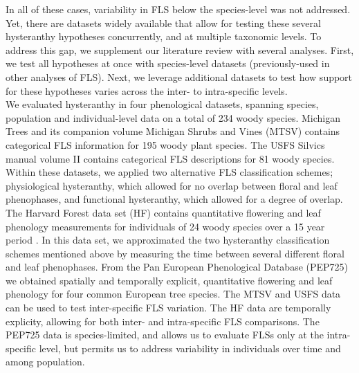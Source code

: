 \documentclass[12pt]{article}\usepackage[]{graphicx}\usepackage[]{color}
\begin{document}
\indent In all of these cases, variability in FLS below the species-level was not addressed. Yet, there are datasets widely available that allow for testing these several hysteranthy hypotheses concurrently, and at multiple taxonomic levels. To address this gap, we supplement our literature review with several analyses. First, we test all hypotheses at once with species-level datasets (previously-used in other analyses of FLS). Next, we leverage additional datasets to test how support for these hypotheses varies across the inter- to intra-specific levels.\\ 

\indent We evaluated hysteranthy in four phenological datasets, spanning species, population and individual-level data on a total of 234 woody species. Michigan Trees and its companion volume Michigan Shrubs and Vines \citep{Barnes2004,Barnes2016} (MTSV) contains categorical FLS information for 195 woody plant species. The USFS Silvics manual volume II \citep{Burns1990} contains categorical FLS descriptions for 81 woody species. Within these datasets, we applied two alternative FLS classification schemes; physiological hysteranthy, which allowed for no overlap between floral and leaf phenophases, and functional hysteranthy, which allowed for a degree of overlap. The Harvard Forest data set (HF) contains quantitative flowering and leaf phenology measurements for individuals of 24 woody species over a 15 year period \citep{OKeefe2015}. In this data set, we approximated the two hysteranthy classification schemes mentioned above by measuring the time between several different floral and leaf phenophases. From the Pan European Phenological Database (PEP725) \citep{PEP725} we obtained spatially and temporally explicit, quantitative flowering and leaf phenology for four common European tree species. The MTSV and USFS data can be used to test inter-specific FLS variation. The HF data are temporally explicity, allowing for both inter- and intra-specific FLS comparisons. The PEP725 data is species-limited, and allows us to evaluate FLSs only at the intra-specific level, but permits us to address variability in individuals over time and among population.\\
\end{document}
